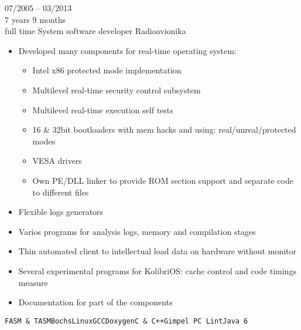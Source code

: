 \begin{entrylist}
    \entry
    {07/2005 -- 03/2013\\\footnotesize{7 years 9 months\\full time}}
    {System software developer}
    {Radioavionika}
    {
        \vspace{-4mm}
        \begin{itemize}[leftmargin=.12in]
            \item Developed many components for real-time operating system:
                \begin{itemize}
                    \setlength\itemsep{0em}
                    \item Intel x86 protected mode implementation
                    \item Multilevel real-time security control subsystem
                    \item Multilevel real-time execution self tests
                    \item 16 \& 32bit bootloaders with mem hacks and using: real/unreal/protected modes
                    \item VESA drivers
                    \item Own PE/DLL linker to provide ROM section support and separate code to different files
                \end{itemize}
            \item Flexible logs generators
            \item Varios programs for analysis logs, memory and compilation stages
            \item Thin automated client to intellectual load data on hardware without monitor
            \item Several experimental programs for KolibriOS: cache control and code timings measure
            \item Documentation for part of the components
        \end{itemize}
    \texttt{FASM \& TASM}\slashsep\texttt{Bochs}\slashsep\texttt{Linux}\slashsep\texttt{GCC}\slashsep\texttt{Doxygen}\slashsep\texttt{C \& C++}\slashsep\texttt{Gimpel PC Lint}\slashsep\texttt{Java 6}}

\end{entrylist}
